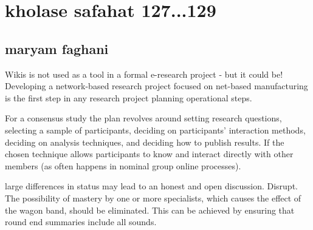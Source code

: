 \documentclass [12pt]{beamer}
\begin{document}
\section*{kholase safahat 127...129}
\subsection*{maryam faghani}	
\begin{frame}
\justifying	
Wikis is not used as a tool in a formal e-research project - but it could be!  Developing a network-based research project focused on net-based manufacturing is the first step in any research project planning operational steps.  
\end{frame}	
\begin{frame}
\justifying	
For a consensus study the plan revolves around setting research questions, selecting a sample of participants, deciding on participants' interaction methods, deciding on analysis techniques, and deciding how to publish results.
If the chosen technique allows participants to know and interact directly with other members (as often happens in nominal group online processes).
\end{frame}
\begin{frame}
\justifying	
large differences in status may lead to an honest and open discussion.  Disrupt.
The possibility of mastery by one or more specialists, which causes the effect of the wagon band, should be eliminated.  This can be achieved by ensuring that round end summaries include all sounds.
\end{frame}
\end{document}
